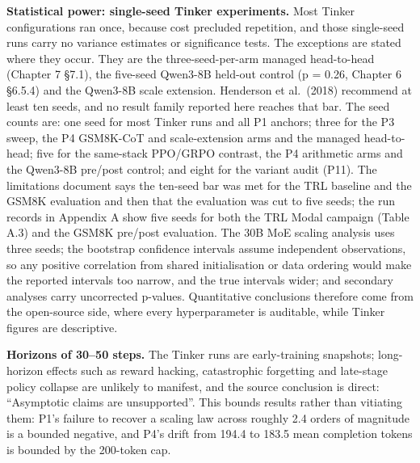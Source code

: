 \documentclass[12pt,a4paper]{report}
\begin{document}
\textbf{Statistical power: single-seed Tinker experiments.} Most Tinker
configurations ran once, because cost precluded repetition, and those
single-seed runs carry no variance estimates or significance tests. The
exceptions are stated where they occur. They are the three-seed-per-arm
managed head-to-head (Chapter 7 §7.1), the five-seed Qwen3-8B held-out
control (p = 0.26, Chapter 6 §6.5.4) and the Qwen3-8B scale extension.
Henderson et al.~(2018) recommend at least ten seeds, and no result
family reported here reaches that bar. The seed counts are: one seed for
most Tinker runs and all P1 anchors; three for the P3 sweep, the P4
GSM8K-CoT and scale-extension arms and the managed head-to-head; five
for the same-stack PPO/GRPO contrast, the P4 arithmetic arms and the
Qwen3-8B pre/post control; and eight for the variant audit (P11). The
limitations document says the ten-seed bar was met for the TRL baseline
and the GSM8K evaluation and then that the evaluation was cut to five
seeds; the run records in Appendix A show five seeds for both the TRL
Modal campaign (Table A.3) and the GSM8K pre/post evaluation. The 30B
MoE scaling analysis uses three seeds; the bootstrap confidence
intervals assume independent observations, so any positive correlation
from shared initialisation or data ordering would make the reported
intervals too narrow, and the true intervals wider; and secondary
analyses carry uncorrected p-values. Quantitative conclusions therefore
come from the open-source side, where every hyperparameter is auditable,
while Tinker figures are descriptive.

\textbf{Horizons of 30--50 steps.} The Tinker runs are early-training
snapshots; long-horizon effects such as reward hacking, catastrophic
forgetting and late-stage policy collapse are unlikely to manifest, and
the source conclusion is direct: ``Asymptotic claims are unsupported''.
This bounds results rather than vitiating them: P1's failure to recover
a scaling law across roughly 2.4 orders of magnitude is a bounded
negative, and P4's drift from 194.4 to 183.5 mean completion tokens is
bounded by the 200-token cap.
\end{document}
